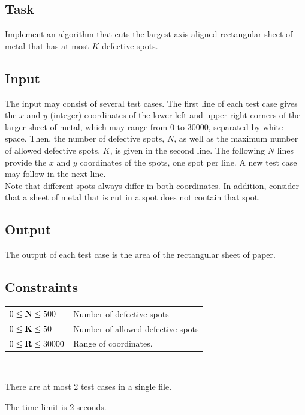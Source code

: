 \documentclass[11pt]{report}
\begin{document}
\subsection*{Task}

Implement an algorithm that cuts the largest axis-aligned rectangular sheet of metal
that has at most $K$ defective spots.

\subsection*{Input}

The input may consist of several test cases. The first line of each test case
gives the $x$ and $y$ (integer) coordinates of the lower-left and
upper-right corners of the larger sheet of metal, which may range from $0$ to $30000$,
separated by white space. Then, the number of defective spots, $N$,
as well as the maximum number of allowed defective spots, $K$, is
given in the second line. The following $N$ lines provide the $x$ and
$y$ coordinates of the spots, one spot per line.
A new test case may follow in the next line.\\

Note that different spots always differ in both coordinates.
In addition, consider that a sheet of metal
that is cut in a spot does not contain that spot.

\subsection*{Output}

The output of each test case is the area of the rectangular sheet of paper.

\subsection*{Constraints}
\begin{tabular}{ l l }
$0 \leq {\bf N} \leq 500$      & Number of defective spots \\
$0 \leq {\bf K} \leq 50$        & Number of allowed defective spots \\
$0 \leq {\bf R} \leq 30000$     & Range of coordinates.
\end{tabular}\\\bigskip

There are at most 2 test cases in a single file.\\\medskip

The time limit is 2 seconds.
\end{document}

